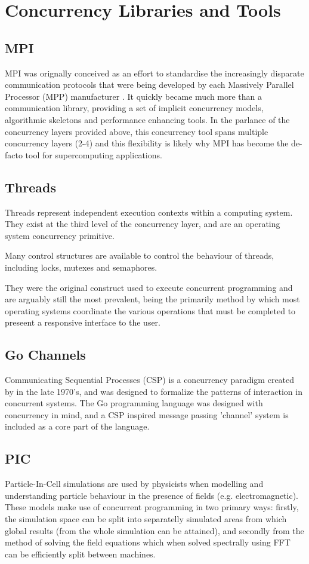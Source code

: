 \documentclass{sig-alternate}
\begin{document}
\section{Concurrency Libraries and Tools}
\subsection{MPI}
MPI was orignally conceived as an effort to standardise the increasingly disparate communication protocols that were being developed by each Massively Parallel Processor (MPP) manufacturer \cite{g.96:_pvm_mpi_compar_featur}. It quickly became much more than a communication library, providing a set of implicit concurrency models, algorithmic skeletons and performance enhancing tools. In the parlance of the concurrency layers provided above, this concurrency tool spans multiple concurrency layers (2-4) and this flexibility is likely why MPI has become the de-facto tool for supercomputing applications.

\subsection{Threads}
Threads represent independent execution contexts within a computing system. They exist at the third level of the concurrency layer, and are an operating system concurrency primitive. 

Many control structures are available to control the behaviour of threads, including locks, mutexes and semaphores.

They were the original construct used to execute concurrent programming and are arguably still the most prevalent, being the primarily method by which most operating systems coordinate the various operations that must be completed to preseent a responsive interface to the user.

\subsection{Go Channels}
Communicating Sequential Processes (CSP) is a concurrency paradigm created by \cite{Hoare:1978:CSP:359576.359585} in the late 1970's, and was designed to formalize the patterns of interaction in concurrent systems. The Go programming language was designed with concurrency in mind, and a CSP inspired message passing 'channel' system is included as a core part of the language.

\subsection{PIC}
Particle-In-Cell simulations are used by physicists when modelling and understanding particle behaviour in the presence of fields (e.g. electromagnetic). These models make use of concurrent programming in two primary ways: firstly, the simulation space can be split into separatelly simulated areas from which global results (from the whole simulation can be attained), and secondly from the method of solving the field  equations which when solved spectrally using FFT can be efficiently split between machines.
\end{document}
